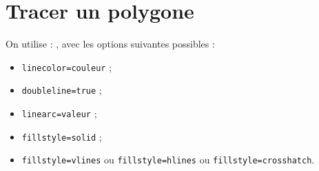 \section{Tracer un polygone}

On utilise : ,
avec les options suivantes possibles :
\begin{itemize}
  \item \texttt{linecolor=couleur} ;
  \item \texttt{doubleline=true} ;
  \item \texttt{linearc=valeur} ;
  \item \texttt{fillstyle=solid} ;
  \item \texttt{fillstyle=vlines} ou \texttt{fillstyle=hlines} ou \texttt{fillstyle=crosshatch}.
\end{itemize}
\newpage
